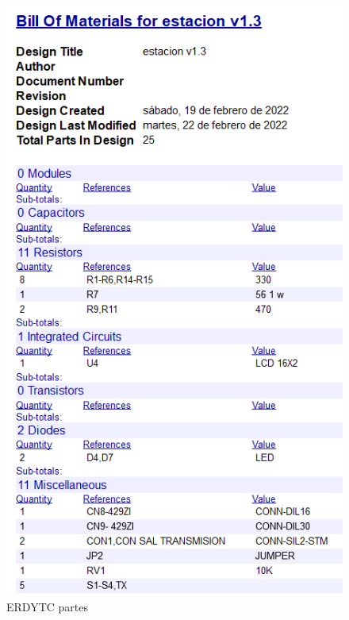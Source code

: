 \documentclass[conference]{IEEEtran}
\begin{document}
\begin{figure}[htbp]
\centering
\includegraphics[width=.9\linewidth]{../../images/estacionBOM.png}
\caption{\label{fig:estacionBOM}ERDYTC partes}
\end{figure}
\end{document}
